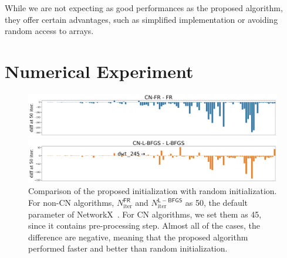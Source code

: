 \documentclass[dvipdfmx,10pt,journal,compsoc]{IEEEtran}
\begin{document}
While we are not expecting as good performances as the proposed algorithm, they offer certain advantages, such as simplified implementation or avoiding random access to arrays.

\section{Numerical Experiment} \label{sec:experiment}

\begin{figure}[t]
  \centering
  \begin{minipage}{\columnwidth}
    \centering
    \includegraphics[width=\columnwidth]{overall/plot/diff_FR_50.pdf}
  \end{minipage}
  \begin{minipage}{\columnwidth}
    \centering
    \includegraphics[width=\columnwidth]{overall/plot/diff_L-BFGS_50.pdf}
  \end{minipage}
  \caption{
    Comparison of the proposed initialization with random initialization.
    For non-\textsf{CN} algorithms, $N_\mathrm{iter}^\mathsf{FR}$ and $N_\mathrm{iter}^\mathsf{L-BFGS}$ as 50, the default parameter of NetworkX~\cite{hagberg2008exploring}.
    For \textsf{CN} algorithms, we set them as 45, since it contains pre-processing step.
    Almost all of the cases, the difference are negative, meaning that the proposed algorithm performed faster and better than random initialization.
  }
  \label{fig:diff_L_BFGS}
\end{figure}
\end{document}
